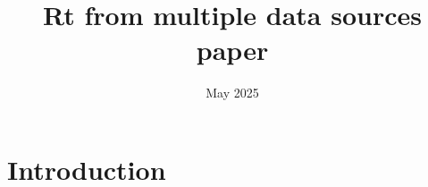 \documentclass{article}
\title{Rt from multiple data sources paper}
\author{}
\date{May 2025}
\begin{document}
\maketitle

\section{Introduction}
\end{document}
